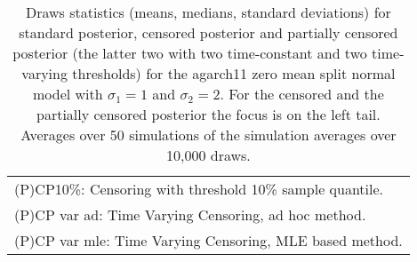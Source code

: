 {\begin{sidewaystable}
\begin{tabular}{cc cc cccc cccc}
\multicolumn{12}{l}{\footnotesize{(P)CP10\%: Censoring with threshold 10\% sample quantile.}}  \\ 
\multicolumn{12}{l}{\footnotesize{(P)CP var ad: Time Varying Censoring, ad hoc method.}} \\ 
\multicolumn{12}{l}{\footnotesize{(P)CP var mle: Time Varying Censoring, MLE based method.}}  \\ 
\end{tabular}
 \caption{Draws statistics (means, medians, standard deviations) for standard posterior, censored posterior and partially censored posterior (the latter two with two time-constant and two time-varying thresholds) for the agarch11 zero mean split normal model with $\sigma_{1} = 1$ and $\sigma_{2} = 2$. For the censored and the partially censored posterior the focus is on the left tail. Averages over 50 simulations of the simulation averages over 10,000 draws.} 
\label{tab:agarch11_pcp_draws}  
\end{sidewaystable}
}